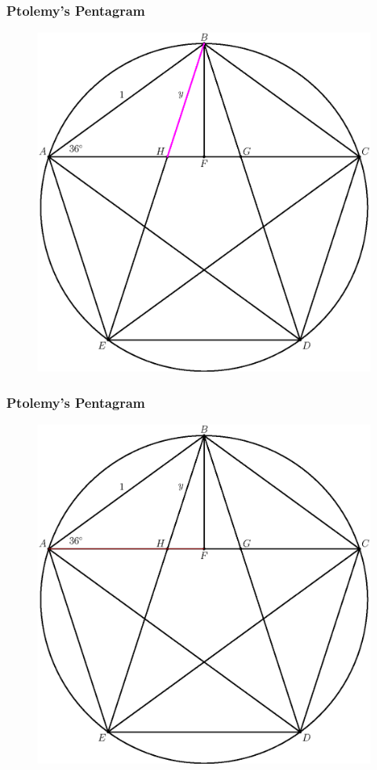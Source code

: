 \documentclass[xcolor=dvipsnames]{beamer}
\begin{document}
\begin{frame}
  \frametitle{Ptolemy's Pentagram}
    \begin{figure}[h]
    \includegraphics[scale=.6]{./ptolemy4.eps}
  \end{figure}
\end{frame}

\begin{frame}
  \frametitle{Ptolemy's Pentagram}
    \begin{figure}[h]
    \includegraphics[scale=.6]{./ptolemy1.eps}
  \end{figure}
\end{frame}
\end{document}

